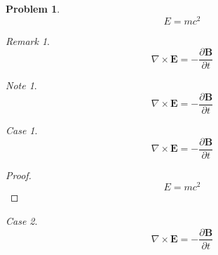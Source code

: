 \documentclass[12pt,english,letterpaper,oneside, article]{memoir}
\theoremstyle{plain} %
\theoremstyle{definition}
\newtheorem{problem}{Problem}[chapter]
\theoremstyle{remark}
\newtheorem*{remark}{Remark}
\newtheorem*{note}{Note}
\newtheorem{case}{Case}
\begin{document}
\begin{problem}

\[E=mc^2\]

\end{problem}

\begin{remark}

\[\nabla \times \mathbf{E} = - \frac{\partial \mathbf{B}}{\partial t}\]

\end{remark}

\begin{note}

\[\nabla \times \mathbf{E} = - \frac{\partial \mathbf{B}}{\partial t}\]

\end{note}

\begin{case}

\[\nabla \times \mathbf{E} = - \frac{\partial \mathbf{B}}{\partial t}\]

\end{case}

\begin{proof}

\[E=mc^2\]

\end{proof}

\begin{case}

\[\nabla \times \mathbf{E} = - \frac{\partial \mathbf{B}}{\partial t}\]

\end{case}
\end{document}
